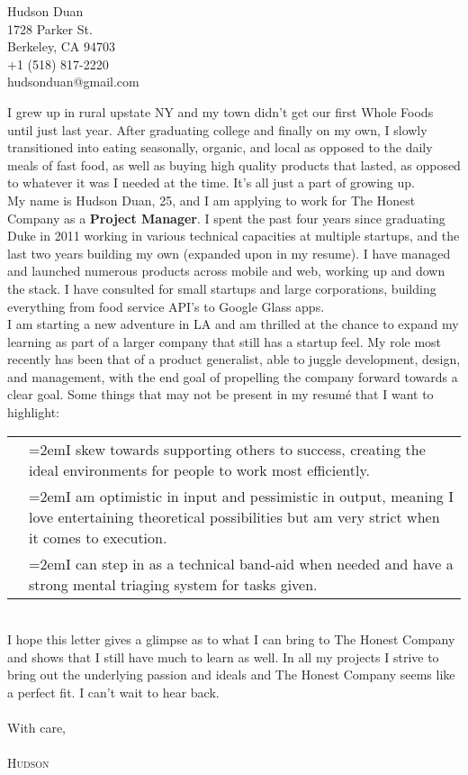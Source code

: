 \documentclass[11pt, letterpaper, UTF-8]{article}
\begin{document}
\begin{flushright}
Hudson Duan\\
1728 Parker St.\\
Berkeley, CA 94703\\
+1 (518) 817-2220\\
hudsonduan@gmail.com\\
\end{flushright}
\bigskip
\hspace{4ex}I grew up in rural upstate NY and my town didn't get our first Whole Foods until just last year. After graduating college and finally on my own, I slowly transitioned into eating seasonally, organic, and local as opposed to the daily meals of fast food, as well as buying high quality products that lasted, as opposed to whatever it was I needed at the time. It's all just a part of growing up.\\ 

My name is Hudson Duan, 25, and I am applying to work for The Honest Company as a \textbf{Project Manager}. I spent the past four years since graduating Duke in 2011 working in various technical capacities at multiple startups, and the last two years building my own (expanded upon in my resume). I have managed and launched numerous products across mobile and web, working up and down the stack. I have consulted for small startups and large corporations, building everything from food service API's to Google Glass apps. \\

I am starting a new adventure in LA and am thrilled at the chance to expand my learning as part of a larger company that still has a startup feel. My role most recently has been that of a product generalist, able to juggle development, design, and management, with the end goal of propelling the company forward towards a clear goal. Some things that may not be present in my resum\'e that I want to highlight:

\bigskip
\begin{tabular}{p{.2in}|p{13cm}}
&\hangindent=2emI skew towards supporting others to success, creating the ideal environments for people to work most efficiently.\\
&\hangindent=2emI am optimistic in input and pessimistic in output, meaning I love entertaining theoretical possibilities but am very strict when it comes to execution.\\
&\hangindent=2emI can step in as a technical band-aid when needed and have a strong mental triaging system for tasks given.\\
\end{tabular}
\bigskip\\
I hope this letter gives a glimpse as to what I can bring to The Honest Company and shows that I still have much to learn as well. In all my projects I strive to bring out the underlying passion and ideals and The Honest Company seems like a perfect fit. I can't wait to hear back.\\
\bigskip\bigskip\\
With care,\\
\\

\bigskip
\noindent 
\textsc{Hudson}\\
\end{document}
